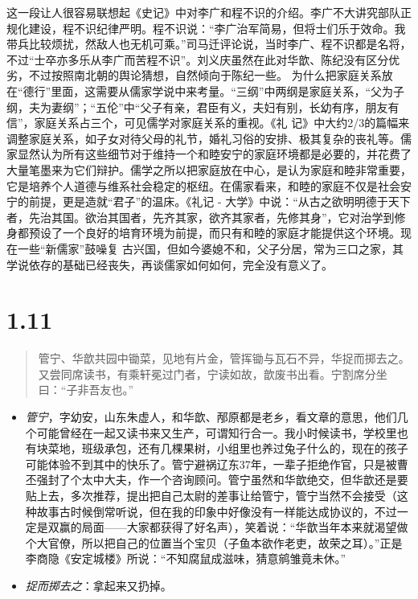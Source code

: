 \documentclass[]{book}
\providecommand{\tightlist}{%
  \setlength{\itemsep}{0pt}\setlength{\parskip}{0pt}}
\begin{document}
这一段让人很容易联想起《史记》中对李广和程不识的介绍。李广不大讲究部队正规化建设，程不识纪律严明。程不识说：``李广治军简易，但将士们乐于效命。我带兵比较烦扰，然敌人也无机可乘。''司马迁评论说，当时李广、程不识都是名将，不过``士卒亦多乐从李广而苦程不识''。刘义庆虽然在此对华歆、陈纪没有区分优劣，不过按照南北朝的舆论猜想，自然倾向于陈纪一些。
为什么把家庭关系放在``德行''里面，这需要从儒家学说中来考量。``三纲''中两纲是家庭关系，``父为子纲，夫为妻纲''；``五伦''中``父子有亲，君臣有义，夫妇有别，长幼有序，朋友有信''，家庭关系占三个，可见儒学对家庭关系的重视。《礼
记》中大约2/3的篇幅来调整家庭关系，如子女对待父母的礼节，婚礼习俗的安排、极其复杂的丧礼等。儒家显然认为所有这些细节对于维持一个和睦安宁的家庭环境都是必要的，并花费了大量笔墨来为它们辩护。儒学之所以把家庭放在中心，是认为家庭和睦非常重要，它是培养个人道德与维系社会稳定的枢纽。在儒家看来，和睦的家庭不仅是社会安宁的前提，更是造就``君子''的温床。《礼记
-
大学》中说：``从古之欲明明德于天下者，先治其国。欲治其国者，先齐其家，欲齐其家者，先修其身''，它对治学到修身都预设了一个良好的培育环境为前提，而只有和睦的家庭才能提供这个环境。现在一些``新儒家''鼓噪复
古兴国，但如今婆媳不和，父子分居，常为三口之家，其学说依存的基础已经丧失，再谈儒家如何如何，完全没有意义了。

\section{1.11}\label{section-10}

\begin{quote}
管宁、华歆共园中锄菜，见地有片金，管挥锄与瓦石不异，华捉而掷去之。又尝同席读书，有乘轩冕过门者，宁读如故，歆废书出看。宁割席分坐曰：``子非吾友也。''
\end{quote}

\begin{itemize}
\tightlist
\item
  \emph{管宁}，字幼安，山东朱虚人，和华歆、邴原都是老乡，看文章的意思，他们几个可能曾经在一起又读书来又生产，可谓知行合一。我小时候读书，学校里也有块菜地，班级承包，还有几棵果树，小组里也养过兔子什么的，现在的孩子可能体验不到其中的快乐了。管宁避祸辽东37年，一辈子拒绝作官，只是被曹丕强封了个太中大夫，作一个咨询顾问。管宁虽然和华歆绝交，但华歆还是要贴上去，多次推荐，提出把自己太尉的差事让给管宁，管宁当然不会接受（这种故事古时候倒常听说，但在我的印象中好像没有一样能达成协议的，不过一定是双赢的局面------大家都获得了好名声），笑着说：``华歆当年本来就渴望做个大官僚，所以把自己的位置当个宝贝（子鱼本欲作老吏，故荣之耳）。''正是李商隐《安定城楼》所说：``不知腐鼠成滋味，猜意鹓雏竟未休。''
\item
  \emph{捉而掷去之}：拿起来又扔掉。
\end{itemize}
\end{document}
